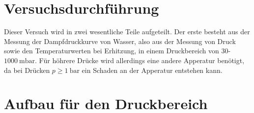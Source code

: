 \section{Versuchsdurchführung}

Dieser Versuch wird in zwei wesentliche Teile aufgeteilt. Der erste besteht aus der Messung der Dampfdruckkurve von Wasser, also aus der Messung von Druck sowie den Temperaturwerten bei Erhitzung, in einem 
Druckbereich von $30$-$\SI{1000}{\milli\bar}$. Für höhrere Drücke wird allerdings eine andere Apperatur benötigt, da bei Drücken $p \geq \SI{1}{\bar}$ ein Schaden an der Apperatur entstehen kann.

\section{Aufbau für den Druckbereich} %
